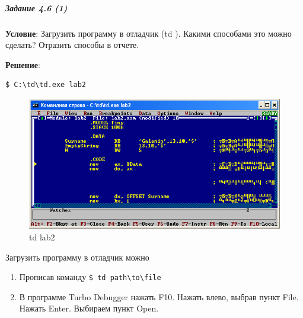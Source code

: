 \subparagraph{Задание 4.6 (1)}

\textbf{Условие}:
Загрузить программу в отладчик (td ). Какими способами это можно сделать? Отразить способы в отчете.

\textbf{Решение}:

\begin{lstlisting}[language=Terminal]
    $ C:\td\td.exe lab2
\end{lstlisting}

\begin{figure}[!htp]
    \centering
    \includegraphics[width=11.2cm]{../_INCLUDES/td.png}
    \caption{td lab2}
\end{figure}

Загрузить программу в отладчик можно 

\begin{enumerate}
    \item Прописав команду \verb|$ td path\to\file|
    \item В программе Turbo Debugger нажать F10. Нажать влево, выбрав пункт File. Нажать Enter. Выбираем пункт Open.
\end{enumerate}


